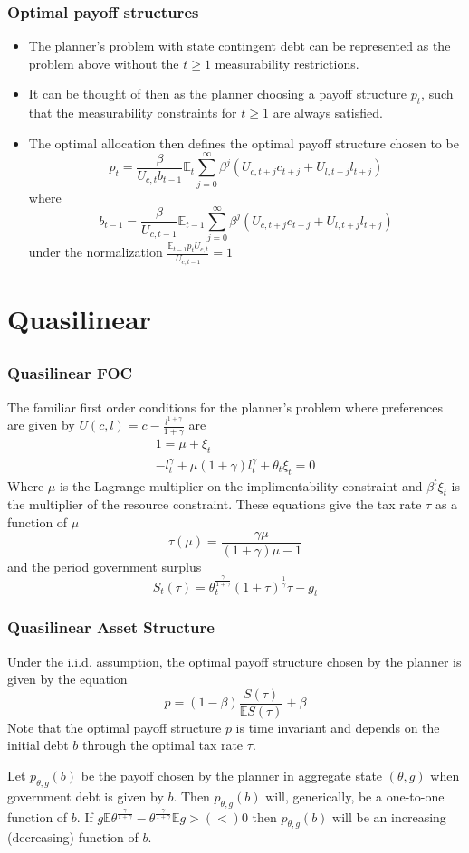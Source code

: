 \documentclass{beamer}
\newcommand{\EE}{\mathbb E}
\begin{document}
 \begin{frame}
\frametitle{Optimal payoff structures}
\begin{itemize}
\item The planner's problem with state contingent debt can be represented as the problem above without the $t\geq1$ measurability restrictions.
\item  It can be thought of then as the planner choosing a payoff structure $p_t$, such that the measurability constraints for $t\geq 1$ are always satisfied.
\item  The optimal allocation then defines the optimal payoff structure chosen to be
\[
	p_t = \frac{\beta}{U_{c,t}b_{t-1}}\EE_t\sum_{j=0}^\infty\beta^j\left(U_{c,t+j}c_{t+j}+U_{l,t+j}l_{t+j}\right)
\]where
\[
	b_{t-1} = \frac{\beta}{U_{c,t-1}}\EE_{t-1}\sum_{j=0}^\infty\beta^j\left(U_{c,t+j}c_{t+j}+U_{l,t+j}l_{t+j}\right)
\]under the normalization $\frac{\EE_{t-1} p_t U_{c,t}}{U_{c,t-1}} = 1$
\end{itemize}
\end{frame} 

\section{Quasilinear}
\subsection{}
 
\begin{frame}
	\frametitle{Quasilinear FOC}
	The familiar first order conditions for the planner's problem where preferences are given by $U(c,l) = c - \frac{l^{1+\gamma}}{1+\gamma}$ are
	\begin{align*}
		1 = \mu +\xi_t\\
		-l_t^\gamma+\mu(1+\gamma)l_t^\gamma+\theta_t\xi_t = 0
	\end{align*}Where $\mu$ is the Lagrange multiplier on the implimentability constraint and $\beta^t\xi_t$ is the multiplier of the resource constraint.   These equations give the tax rate $\tau$ as a function of $\mu$
	\[
		\tau(\mu) = \frac{\gamma\mu}{(1+\gamma)\mu-1}
	\] and the period government surplus 
	\[
		S_t(\tau) = \theta_t^\frac\gamma{1+\gamma}(1+\tau)^\frac1\gamma\tau-g_t
	\]
\end{frame}

\begin{frame}
	\frametitle{Quasilinear Asset Structure}
	Under the i.i.d. assumption, the optimal payoff structure chosen by the planner is given by the equation
	\[
		p = (1-\beta)\frac{S(\tau)}{\EE S(\tau)} + \beta
	\]Note that the optimal payoff structure $p$ is time invariant and depends on the initial debt $b$ through the optimal tax rate $\tau$.
	\begin{lemma}  Let $p_{\theta,g}(b)$ be the payoff chosen by the planner in aggregate state $(\theta,g)$ when government debt is given by $b$.  Then $p_{\theta,g}(b)$ will, generically, be a one-to-one function of $b$.  If $g\EE\theta^\frac{\gamma}{1+\gamma}-\theta^\frac{\gamma}{1+\gamma}\EE g > (<) 0$ then $p_{\theta,g}(b)$ will be an increasing (decreasing) function of $b$. 
	\end{lemma}
\end{frame}
\end{document}
